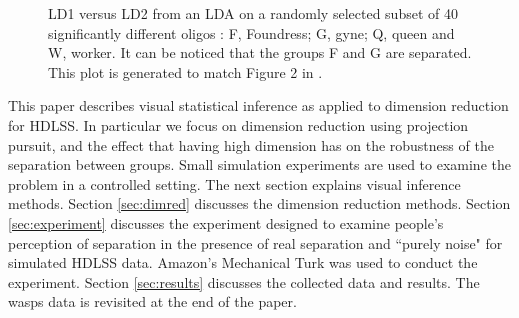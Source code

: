 \begin{figure}[hbtp]
   \centering
       \caption{LD1 versus LD2 from an LDA on a randomly selected subset of 40 significantly different oligos : F, Foundress; G, gyne; Q, queen and W, worker. It can be noticed that the groups F and G are separated. This plot is generated to match Figure 2 in \cite{toth:2010}. }
     \label{oligo}
\end{figure}  

This paper describes visual statistical inference as applied to dimension reduction for HDLSS. In particular we focus on dimension reduction using projection pursuit, and the effect that having high dimension has on the robustness of the separation between groups.  Small simulation experiments are used to examine the problem in a controlled setting. The next section explains visual inference methods. Section \ref{sec:dimred} discusses the dimension reduction methods. Section \ref{sec:experiment} discusses the experiment designed to examine people's perception of separation in the presence of real separation and ``purely noise" for simulated HDLSS data. Amazon's Mechanical Turk \citep{turk} was used to conduct the experiment. Section \ref{sec:results} discusses the collected data and results. The wasps data is revisited at the end of the paper. 

